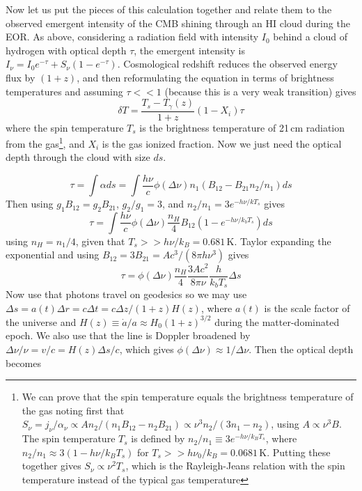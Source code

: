 Now let us put the pieces of this calculation together and relate them to the observed emergent intensity of the CMB shining through an HI cloud during the EOR. As above, considering a radiation field with intensity $I_0$ behind a cloud of hydrogen with optical depth $\tau$, the emergent intensity is $I_\nu=I_0e^{-\tau}+S_\nu(1-e^{-\tau})$. Cosmological redshift reduces the observed energy flux by $(1+z)$, and then reformulating the equation in terms of brightness temperatures and assuming $\tau<<1$ (because this is a very weak transition) gives
\begin{equation}
\delta T=\frac{T_s-T_\gamma(z)}{1+z} (1-X_i)\tau
\end{equation}
where the spin temperature $T_s$ is the brightness temperature of 21\,cm radiation from the gas\footnote{We can prove that the spin temperature equals the brightness temperature of the gas noting first that $S_\nu=j_\nu/\alpha_\nu\propto A n_2/(n_1B_{12}-n_2B_{21})\propto\nu^3n_2/(3n_1-n_2)$, using $A\propto\nu^3B$. The spin temperature $T_s$ is defined by $n_2/n_1\equiv3e^{-h\nu/k_B T_s}$, where $n_2/n_1\approx3(1-h\nu/k_BT_s)$ for $T_s>>h\nu_0/k_B= 0.0681$\,K. Putting these together gives $S_\nu\propto \nu^2 T_s$, which is the Rayleigh-Jeans relation with the spin temperature instead of the typical gas temperature}, and $X_i$ is the gas ionized fraction. Now we just need the optical depth through the cloud with size $ds$.

\begin{equation}
\tau=\int\alpha ds=\int\frac{h\nu}{c}\phi(\Delta\nu)n_1(B_{12}-B_{21}n_2/n_1)ds
\end{equation}
Then using $g_1B_{12}=g_2B_{21}$, $g_2/g_1=3$, and $n_2/n_1=3e^{-h\nu/kT_s}$ gives
\begin{equation}
\tau=\int\frac{h\nu}{c}\phi(\Delta\nu)\frac{n_H}{4}B_{12}(1-e^{-h\nu/k_bT_s})ds
\end{equation}
using $n_H=n_1/4$, given that $T_s>>h\nu/k_B=0.681$\,K. Taylor expanding the exponential and using $B_{12}=3B_{21}=Ac^3/(8\pi h\nu^3)$ gives
\begin{equation}
\tau=\phi(\Delta\nu)\frac{n_H}{4}\frac{3Ac^2}{8\pi\nu}\frac{h}{k_bT_s}\Delta s
\end{equation}
Now use that photons travel on geodesics so we may use $\Delta s=a(t)\Delta r=c\Delta t=c\Delta z/(1+z)H(z)$, where $a(t)$ is the scale factor of the universe and $H(z)\equiv \dot{a}/a\approx H_0(1+z)^{3/2}$ during the matter-dominated epoch. We also use that the line is Doppler broadened by $\Delta\nu/\nu=v/c=H(z)\Delta s/c$, which gives $\phi(\Delta\nu)\approx1/\Delta \nu$. Then the optical depth becomes

